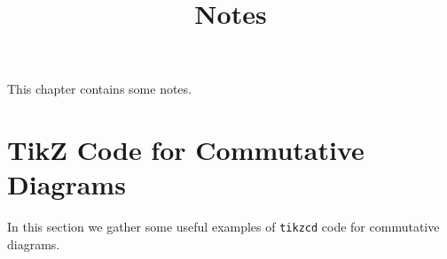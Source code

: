 




\title{Notes}

\maketitle

\label{section-phantom}

This chapter contains some notes.

\ChapterTableOfContents

\section{TikZ Code for Commutative Diagrams}\label{section-tikz-code-for-commutative-diagrams}
In this section we gather some useful examples of \texttt{tikzcd} code for commutative diagrams.

